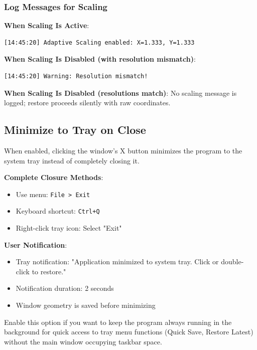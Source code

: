 \documentclass[a4paper,11pt]{article}
\begin{document}
\subsubsection{Log Messages for Scaling}

\textbf{When Scaling Is Active}:
\begin{verbatim}
[14:45:20] Adaptive Scaling enabled: X=1.333, Y=1.333
\end{verbatim}

\textbf{When Scaling Is Disabled (with resolution mismatch)}:
\begin{verbatim}
[14:45:20] Warning: Resolution mismatch!
\end{verbatim}

\textbf{When Scaling Is Disabled (resolutions match)}:
No scaling message is logged; restore proceeds silently with raw coordinates.

\subsection{Minimize to Tray on Close}

When enabled, clicking the window's X button minimizes the program to
the system tray instead of completely closing it.

\textbf{Complete Closure Methods}:
\begin{itemize}
  \item Use menu: \texttt{File > Exit}
  \item Keyboard shortcut: \texttt{Ctrl+Q}
  \item Right-click tray icon: Select "Exit"
\end{itemize}

\textbf{User Notification}:
\begin{itemize}
  \item Tray notification: "Application minimized to system tray.
    Click or double-click to restore."
  \item Notification duration: 2 seconds
  \item Window geometry is saved before minimizing
\end{itemize}

\begin{infobox}
  Enable this option if you want to keep the program always running
  in the background for quick access to tray menu functions (Quick
  Save, Restore Latest) without the main window occupying taskbar space.
\end{infobox}
\end{document}
